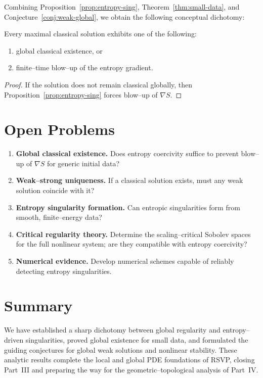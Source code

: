 Combining Proposition~\ref{prop:entropy-sing},
Theorem~\ref{thm:small-data},
and Conjecture~\ref{conj:weak-global}, we obtain the following
conceptual dichotomy:

\begin{theorem}
\label{thm:dichotomy}
Every maximal classical solution exhibits one of the following:
\begin{enumerate}
\item global classical existence, or
\item finite--time blow--up of the entropy gradient.
\end{enumerate}
\end{theorem}

\begin{proof}
If the solution does not remain classical globally, then
Proposition~\ref{prop:entropy-sing} forces blow--up of $\nabla S$.
\end{proof}



\section{Open Problems}
\label{sec:open-problems-11}

\begin{enumerate}
\item \textbf{Global classical existence.}
Does entropy coercivity suffice to prevent blow--up of $\nabla S$
for generic initial data?

\item \textbf{Weak--strong uniqueness.}
If a classical solution exists, must any weak solution coincide with it?

\item \textbf{Entropy singularity formation.}
Can entropic singularities form from smooth, finite--energy data?

\item \textbf{Critical regularity theory.}
Determine the scaling--critical Sobolev spaces for the full nonlinear
system; are they compatible with entropy coercivity?

\item \textbf{Numerical evidence.}
Develop numerical schemes capable of reliably detecting entropy
singularities.
\end{enumerate}



\section{Summary}

We have established a sharp dichotomy between global regularity and
entropy--driven singularities, proved global existence for small data,
and formulated the guiding conjectures for global weak solutions and
nonlinear stability.  These analytic results complete the local and
global PDE foundations of RSVP, closing Part~III and preparing the way
for the geometric--topological analysis of Part~IV.

